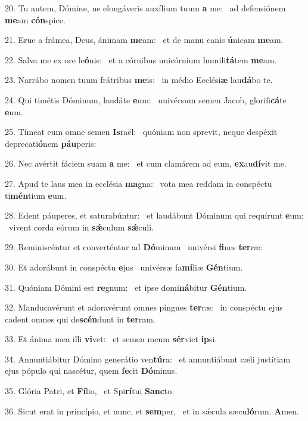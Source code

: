 20. Tu autem, Dómine, ne elongáveris auxílium tuum \textbf{a} me: \ast\  ad defensiónem \textbf{me}am \textbf{cón}spice.\

21. Erue a frámea, Deus, ánimam \textbf{me}am: \ast\  et de manu canis \textbf{ú}nicam \textbf{me}am.\

22. Salva me ex ore le\textbf{ó}nis: \ast\  et a córnibus unicórnium humili\textbf{tá}tem \textbf{me}am.\

23. Narrábo nomen tuum frátribus \textbf{me}is: \ast\  in médio Ecclési\textbf{æ} lau\textbf{dá}bo te.\

24. Qui timétis Dóminum, laudáte \textbf{e}um: \ast\  univérsum semen Jacob, glorifi\textbf{cá}te \textbf{e}um.\

25. Tímeat eum omne semen \textbf{Is}raël: \ast\  quóniam non sprevit, neque despéxit deprecati\textbf{ó}nem \textbf{páu}peris:\

26. Nec avértit fáciem suam \textbf{a} me: \ast\  et cum clamárem ad eum, \textbf{ex}au\textbf{dí}vit me.\

27. Apud te laus mea in ecclésia \textbf{ma}gna: \ast\  vota mea reddam in conspéctu ti\textbf{mén}tium \textbf{e}um.\

28. Edent páuperes, et saturabúntur: \dag\  et laudábunt Dóminum qui requírunt \textbf{e}um: \ast\  vivent corda eórum in \textbf{sǽ}culum \textbf{sǽ}culi.\

29. Reminiscéntur et converténtur ad \textbf{Dó}minum \ast\  univérsi \textbf{fi}nes \textbf{ter}ræ:\

30. Et adorábunt in conspéctu \textbf{e}jus \ast\  univérsæ fa\textbf{mí}liæ \textbf{Gén}tium.\

31. Quóniam Dómini est \textbf{re}gnum: \ast\  et ipse domi\textbf{ná}bitur \textbf{Gén}tium.\

32. Manducavérunt et adoravérunt omnes pingues \textbf{ter}ræ: \ast\  in conspéctu ejus cadent omnes qui de\textbf{scén}dunt in \textbf{ter}ram.\

33. Et ánima mea illi \textbf{vi}vet: \ast\  et semen meum \textbf{sér}viet \textbf{ip}si.\

34. Annuntiábitur Dómino generátio ven\textbf{tú}ra: \ast\  et annuntiábunt cæli justítiam ejus pópulo qui nascétur, quem \textbf{fe}cit \textbf{Dó}minus.\

35. Glória Patri, et \textbf{Fí}lio, \ast\  et Spi\textbf{rí}tui \textbf{Sanc}to.\

36. Sicut erat in princípio, et nunc, et \textbf{sem}per, \ast\  et in sǽcula sæcu\textbf{ló}rum. \textbf{A}men.\

